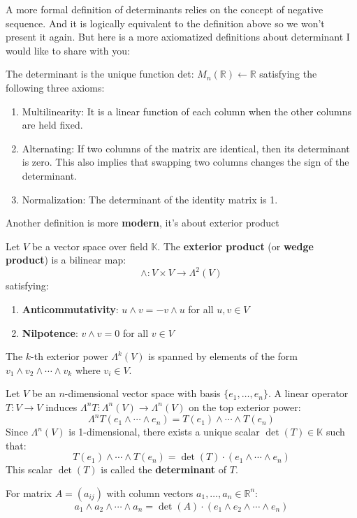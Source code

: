 A more formal definition of determinants relies on the concept of negative sequence. And it is logically equivalent to the definition above so we won't present it again. But here is a more axiomatized definitions about determinant I would like to share with you:

\begin{definition}
The determinant is the unique function det: $M_n(\mathbb{R}) \leftarrow \mathbb{R}$ satisfying the following three axioms:
\begin{enumerate}
    \item Multilinearity: It is a linear function of each column when the other columns are held fixed.
    \item Alternating: If two columns of the matrix are identical, then its determinant is zero. This also implies that swapping two columns changes the sign of the determinant.
    \item Normalization: The determinant of the identity matrix is 1.
\end{enumerate}
\end{definition}

Another definition is more \textbf{modern}, it's about exterior product

\begin{definition}
Let $V$ be a vector space over field $\mathbb{K}$. The \textbf{exterior product} (or \textbf{wedge product}) is a bilinear map:
\[
\wedge: V \times V \to \Lambda^2(V)
\]
satisfying:
\begin{enumerate}
    \item \textbf{Anticommutativity}: $u \wedge v = -v \wedge u$ for all $u, v \in V$
    \item \textbf{Nilpotence}: $v \wedge v = 0$ for all $v \in V$
\end{enumerate}
The $k$-th exterior power $\Lambda^k(V)$ is spanned by elements of the form $v_1 \wedge v_2 \wedge \cdots \wedge v_k$ where $v_i \in V$.
\end{definition}

\begin{definition}
Let $V$ be an $n$-dimensional vector space with basis $\{e_1, \ldots, e_n\}$. A linear operator $T: V \to V$ induces $\Lambda^nT: \Lambda^n(V) \to \Lambda^n(V)$ on the top exterior power:
\[
\Lambda^nT(e_1 \wedge \cdots \wedge e_n) = T(e_1) \wedge \cdots \wedge T(e_n)
\]
Since $\Lambda^n(V)$ is 1-dimensional, there exists a unique scalar $\det(T) \in \mathbb{K}$ such that:
\[
T(e_1) \wedge \cdots \wedge T(e_n) = \det(T) \cdot (e_1 \wedge \cdots \wedge e_n)
\]
This scalar $\det(T)$ is called the \textbf{determinant} of $T$.

For matrix $A = (a_{ij})$ with column vectors $a_1, \ldots, a_n \in \mathbb{R}^n$:
\[
a_1 \wedge a_2 \wedge \cdots \wedge a_n = \det(A) \cdot (e_1 \wedge e_2 \wedge \cdots \wedge e_n)
\]
\end{definition}

